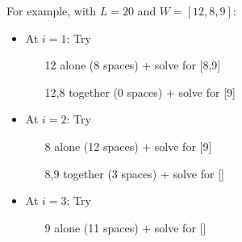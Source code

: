   \begin{example}
    For example, with $L=20$ and $W=[12,8,9]$:
    \begin{itemize}
      \item At $i=1$: Try
        \begin{itemize}
          \item [12] alone (8 spaces) + solve for [8,9]
          \item [12,8] together (0 spaces) + solve for [9]
        \end{itemize}
      \item At $i=2$: Try
        \begin{itemize}
          \item [8] alone (12 spaces) + solve for [9]
          \item [8,9] together (3 spaces) + solve for []
        \end{itemize}
      \item At $i=3$: Try
        \begin{itemize}
          \item [9] alone (11 spaces) + solve for []
        \end{itemize}
    \end{itemize}
  \end{example}

